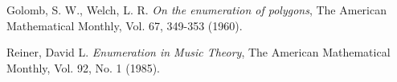 \begin{thebibliography}{00}
			
			{\sc Golomb, S. W., Welch, L. R.}
			\textit{On the enumeration of polygons},
			The American Mathematical Monthly, Vol. 67, 349-353
			(1960).
			
			{\sc Reiner, David L.}
			\textit{Enumeration in Music Theory},
			The American Mathematical Monthly, Vol. 92, No. 1
			(1985).
			
			
			
			
			
			
			
			
						
	\end{thebibliography}